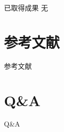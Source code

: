 \documentclass[mathserif,compress,CJKutf8, red]{beamer}
\newcommand{\chuhao}{\fontsize{42pt}{\baselineskip}\selectfont}     %
\begin{document}
\begin{CJK*}{UTF8}{song}
\begin{frame}{已取得成果}
无
\end{frame}

\section{参考文献}

\begin{frame}[allowframebreaks]{参考文献}
\tiny


\end{frame}

\section*{Q\&A}

\begin{frame}{Q\&A}
\begin{block}{}
\centerline{\chuhao{Q\&A}}
\end{block}
\end{frame}
\end{CJK*}
\end{document}
